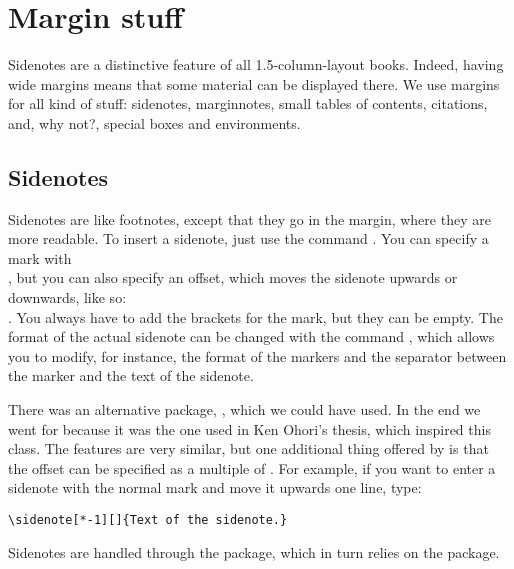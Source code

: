 \setchapterpreamble[u]{\margintoc}
\chapter{Margin stuff}

Sidenotes are a distinctive feature of all 1.5-column-layout books. 
Indeed, having wide margins means that some material can be displayed 
there. We use margins for all kind of stuff: sidenotes, marginnotes, 
small tables of contents, citations, and, why not?, special boxes and 
environments.

\section{Sidenotes}

Sidenotes are like footnotes, except that they go in the margin, where 
they are more readable. To insert a sidenote, just use the command 
. You can specify a 
mark with \\ 
, but you can also specify an offset, 
which moves the sidenote upwards or downwards, like so: \\ 
. You always have to add the 
brackets for the mark, but they can be empty. The format of the actual 
sidenote can be changed with the command , which 
allows you to modify, for instance, the format of the markers and the 
separator between the marker and the text of the sidenote.

There was an alternative package, , which we could 
have used. In the end we went for  because it was the 
one used in Ken Ohori's thesis, which inspired this class. The features 
are very similar, but one additional thing offered by  
is that the offset can be specified as a multiple of 
. For example, if you want to enter a sidenote 
with the normal mark and move it upwards one line, type:

\begin{lstlisting}[style=kaolstplain]
\sidenote[*-1][]{Text of the sidenote.}
\end{lstlisting}

Sidenotes are handled through the  package, which in 
turn relies on the  package.

